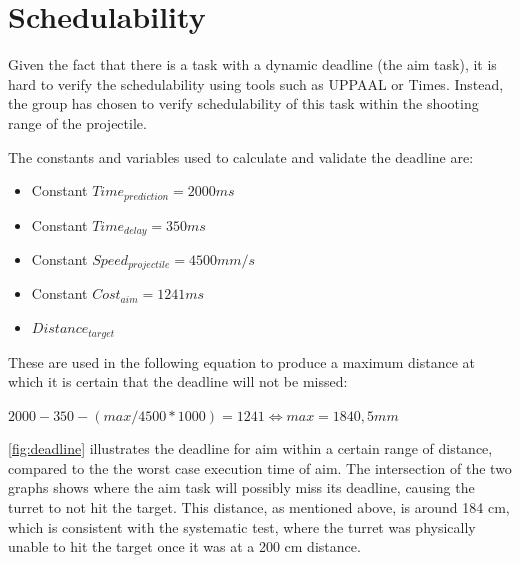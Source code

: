 \section{Schedulability}
Given the fact that there is a task with a dynamic deadline (the aim task), it is hard to verify the schedulability using tools such as UPPAAL or Times. Instead, the group has chosen to verify schedulability of this task within the shooting range of the projectile.


The constants and variables used to calculate and validate the deadline are:
\begin{itemize}
	\item Constant $Time_{prediction} = 2000 ms$
	\item Constant $Time_{delay} = 350 ms$
	\item Constant $Speed_{projectile} = 4500 mm/s$
	\item Constant $Cost_{aim} = 1241 ms$ 
	\item $Distance_{target}$
\end{itemize}

These are used in the following equation to produce a maximum distance at which it is certain that the deadline will not be missed: 

$2000-350-(max/4500*1000)=1241 \Leftrightarrow max = 1840,5 mm$

\autoref{fig:deadline} illustrates the deadline for aim within a certain range of distance, compared to the the worst case execution time of aim. The intersection of the two graphs shows where the aim task will possibly miss its deadline, causing the turret to not hit the target. This distance, as mentioned above, is around 184 cm, which is consistent with the systematic test, where the turret was physically unable to hit the target once it was at a 200 cm distance. 

